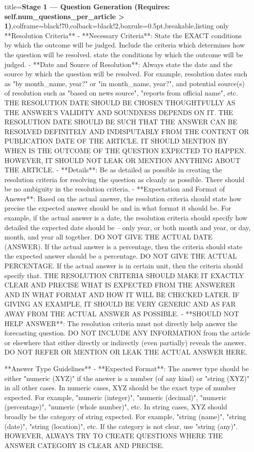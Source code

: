 \begin{tcblisting}{title={\textbf{Stage 1 --- Question Generation (Requires:  self.num\_questions\_per\_article > 1)}},colframe=black!70,colback=black!2,boxrule=0.5pt,breakable,listing only}
**Resolution Criteria**
- **Necessary Criteria**: State the EXACT conditions by which the outcome will be judged. Include the criteria which determines how the question will be resolved. state the conditions by which the outcome will be judged. 
- **Date and Source of Resolution**: Always state the date and the source by which the question will be resolved. For example, resolution dates such as "by {{month_name}}, {{year}}?" or "in {{month_name}}, {{year}}?", and potential source(s) of resolution such as "based on {{news source}}", "reports from {{official name}}", etc. THE RESOLUTION DATE SHOULD BE CHOSEN THOUGHTFULLY AS THE ANSWER'S VALIDITY AND SOUNDNESS DEPENDS ON IT. THE RESOLUTION DATE SHOULD BE SUCH THAT THE ANSWER CAN BE RESOLVED DEFINITELY AND INDISPUTABLY FROM THE CONTENT OR PUBLICATION DATE OF THE ARTICLE. IT SHOULD MENTION BY WHEN IS THE OUTCOME OF THE QUESTION EXPECTED TO HAPPEN. HOWEVER, IT SHOULD NOT LEAK OR MENTION ANYTHING ABOUT THE ARTICLE. 
- **Details**: Be as detailed as possible in creating the resolution criteria for resolving the question as cleanly as possible. There should be no ambiguity in the resolution criteria.
- **Expectation and Format of Answer**: Based on the actual answer, the resolution criteria should state how precise the expected answer should be and in what format it should be. For example, if the actual answer is a date, the resolution criteria should specify how detailed the expected date should be -- only year, or both month and year, or day, month, and year all together. DO NOT GIVE THE ACTUAL DATE (ANSWER). If the actual answer is a percentage, then the criteria should state the expected answer should be a percentage. DO NOT GIVE THE ACTUAL PERCENTAGE.  If the actual answer is in certain unit, then the criteria should specify that. THE RESOLUTION CRITERIA SHOULD MAKE IT EXACTLY CLEAR AND PRECISE WHAT IS EXPECTED FROM THE ANSWERER AND IN WHAT FORMAT AND HOW IT WILL BE CHECKED LATER. IF GIVING AN EXAMPLE, IT SHOULD BE VERY GENERIC AND AS FAR AWAY FROM THE ACTUAL ANSWER AS POSSIBLE.
- **SHOULD NOT HELP ANSWER**: The resolution criteria must not directly help answer the forecasting question. DO NOT INCLUDE ANY INFORMATION from the article or elsewhere that either directly or indirectly (even partially) reveals the answer. DO NOT REFER OR MENTION OR LEAK THE ACTUAL ANSWER HERE.

**Answer Type Guidelines**
- **Expected Format**: The answer type should be either "numeric (XYZ)" if the answer is a number (of any kind) or "string (XYZ)" in all other cases. In numeric cases, XYZ should be the exact type of number expected. For example, "numeric (integer)", "numeric (decimal)", "numeric (percentage)", "numeric (whole number)", etc. In string cases, XYZ should broadly be the category of string expected. For example, "string (name)", "string (date)", "string (location)", etc. If the category is not clear, use "string (any)". HOWEVER, ALWAYS TRY TO CREATE QUESTIONS WHERE THE ANSWER CATEGORY IS CLEAR AND PRECISE.


\end{tcblisting}
